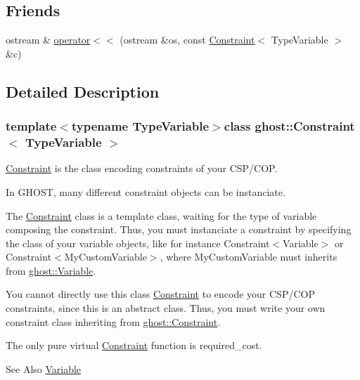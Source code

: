 \subsection*{Friends}
\begin{DoxyCompactItemize}
\item 
ostream \& \hyperlink{classghost_1_1Constraint_a5fa7c37883c5e8fc8dde355ecfe5f70d}{operator$<$$<$} (ostream \&os, const \hyperlink{classghost_1_1Constraint}{Constraint}$<$ Type\-Variable $>$ \&c)
\end{DoxyCompactItemize}


\subsection{Detailed Description}
\subsubsection*{template$<$typename Type\-Variable$>$class ghost\-::\-Constraint$<$ Type\-Variable $>$}

\hyperlink{classghost_1_1Constraint}{Constraint} is the class encoding constraints of your C\-S\-P/\-C\-O\-P. 

In G\-H\-O\-S\-T, many different constraint objects can be instanciate.

The \hyperlink{classghost_1_1Constraint}{Constraint} class is a template class, waiting for the type of variable composing the constraint. Thus, you must instanciate a constraint by specifying the class of your variable objects, like for instance Constraint$<$\-Variable$>$ or Constraint$<$\-My\-Custom\-Variable$>$, where My\-Custom\-Variable must inherits from \hyperlink{classghost_1_1Variable}{ghost\-::\-Variable}.

You cannot directly use this class \hyperlink{classghost_1_1Constraint}{Constraint} to encode your C\-S\-P/\-C\-O\-P constraints, since this is an abstract class. Thus, you must write your own constraint class inheriting from \hyperlink{classghost_1_1Constraint}{ghost\-::\-Constraint}.

The only pure virtual \hyperlink{classghost_1_1Constraint}{Constraint} function is required\-\_\-cost.

\begin{DoxySeeAlso}{See Also}
\hyperlink{classghost_1_1Variable}{Variable} 
\end{DoxySeeAlso}


